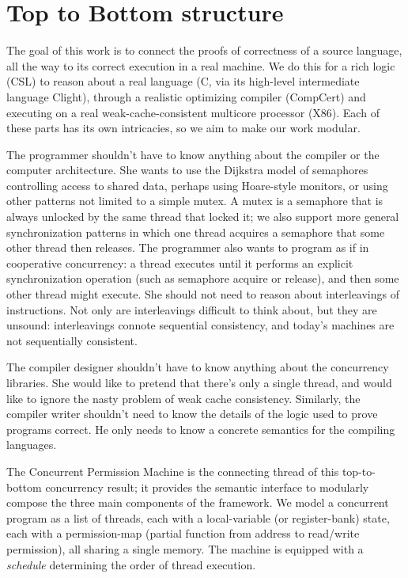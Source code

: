 \chapter{Top to Bottom structure \label{ch:topbottom}}

The goal of this work is to connect the proofs of correctness of a source language, all the way to its correct execution in a real machine. We do this for a rich logic (CSL) to reason about a real language (C, via its high-level intermediate language Clight), through a realistic optimizing compiler (CompCert) and executing on a real weak-cache-consistent multicore processor (X86). Each of these parts has its own intricacies, so we aim to make our work modular. 

The programmer shouldn't have to know anything about the compiler or the computer architecture. She wants to use the Dijkstra model of semaphores controlling access to shared data, perhaps using Hoare-style monitors, or using other patterns not limited to a simple mutex. A mutex is a semaphore that is always unlocked by the same thread that locked it; we also support more general synchronization patterns in which one thread acquires a semaphore that some other thread then releases. The programmer also wants to program as if in cooperative concurrency: a thread executes until it performs an explicit synchronization operation (such as semaphore acquire or release), and then some other thread might execute. She should not need to reason about interleavings of instructions. Not only are interleavings difficult to think about, but they are unsound: interleavings connote sequential consistency, and today's machines are not sequentially consistent. 

The compiler designer shouldn't have to know anything about the concurrency libraries. She would like to pretend that there's only a single thread, and would like to ignore the nasty problem of weak cache consistency. Similarly, the compiler writer shouldn't need to know the details of the logic used to prove programs correct. He only needs to know a concrete semantics for the compiling languages.

The Concurrent Permission Machine is the connecting thread of this top-to-bottom concurrency result; it provides the semantic interface to modularly compose the three main components of the framework. 
We model a concurrent program as a list of threads,
each with a local-variable (or register-bank) state,
each with a permission-map (partial function from address
to read/write permission), all sharing a single memory.
The machine is equipped with a \emph{schedule}
determining the order of thread execution.

